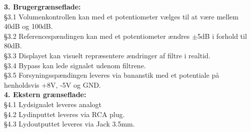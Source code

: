 \textbf{3. Brugergrænseflade:}\\
§3.1 Volumenkontrollen kan med et potentiometer vælges til at være mellem 40dB og 100dB.\\ 
%
§3.2 Referencespændingen kan med et potentiometer ændres $\pm$5dB i forhold til 80dB.\\
%
§3.3 Displayet kan visuelt repræsentere ændringer af filtre i realtid.\\ 
%
§3.4 Bypass kan lede signalet udenom filtrene.\\
%
§3.5 Forsyningsspændingen leveres via bananstik med et potentiale på henholdsvis +8V, -5V og GND.\\ 
\blankline	
\textbf{4. Ekstern grænseflade:}\\
§4.1 Lydsignalet leveres analogt\\ 
§4.2 Lydinputtet leveres via RCA plug.\\
§4.3 Lydoutputtet leveres via Jack 3.5mm.\\
